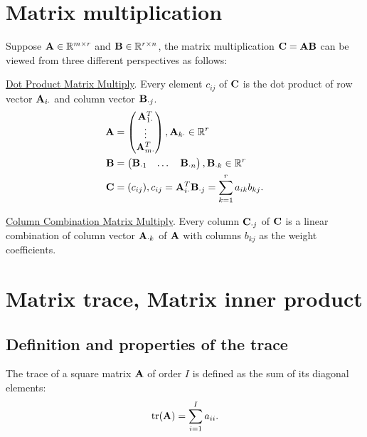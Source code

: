\section{Matrix multiplication}
Suppose $\bold{A}\in\mathbb{R}^{m\times r}$ and $\bold{B}\in \mathbb{R}^{r\times n}$,
the matrix multiplication $\bold{C}=\bold{A}\bold{B}$ can be viewed from
three different perspectives as follows:
\par
\underline{Dot Product Matrix Multiply}. 
Every element $c_{ij}$ of $\bold{C}$ is the 
dot product of row vector $\bold{A}_{i\cdot}$ and column vector $\bold{B}_{\cdot j}$.
\begin{align*}
    \bold{A}&=\begin{pmatrix}
        \bold{A}_{1\cdot}^T\\ \vdots\\\bold{A}_{m\cdot}^T
    \end{pmatrix},\bold{A}_{k\cdot}\in\mathbb{R}^r\\
    \bold{B}&=\begin{pmatrix}
        \bold{B}_{\cdot 1}&\dots&\bold{B}_{\cdot n}
    \end{pmatrix},\bold{B}_{\cdot k}\in\mathbb{R}^r\\
    \bold{C}&=(c_{ij}),c_{ij}=\bold{A}_{i\cdot}^T\bold{B}_{\cdot j}=\sum\limits_{k=1}^{r}a_{ik}b_{kj}.
\end{align*}
\par
\underline{Column Combination Matrix Multiply}.
Every column $\bold{C}_{\cdot j}$ of $\bold{C}$ is a linear combination of column vector
$\bold{A}_{\cdot k}$ of $\bold{A}$ with columns $b_{kj}$ as the weight coefficients.






\section{Matrix trace, Matrix inner product}

\subsection{Definition and properties of the trace}
\begin{definition}{}{}
    The trace of a square matrix $\bold{A}$ of order $I$ is defined as the sum of its diagonal elements:
    \begin{align*}
        \text{tr}(\bold{A})=\sum\limits_{i=1}^{I}a_{ii}.
    \end{align*}
\end{definition}

